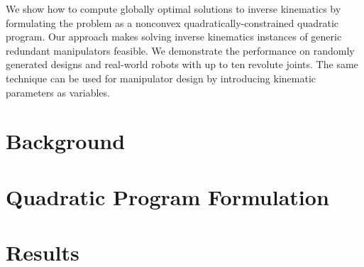 \documentclass[../main.tex]{subfiles}
\begin{document}
We show how to compute globally optimal solutions to inverse kinematics by formulating the problem as a nonconvex quadratically-constrained quadratic program. Our approach makes solving inverse kinematics instances of generic redundant manipulators feasible. We demonstrate the performance on randomly generated designs and real-world robots with up to ten revolute joints. The same technique can be used for manipulator design by introducing kinematic parameters as variables.

\section{Background}


\section{Quadratic Program Formulation}\label{sec:kinematicsformulation}


\section{Results}

\end{document}

